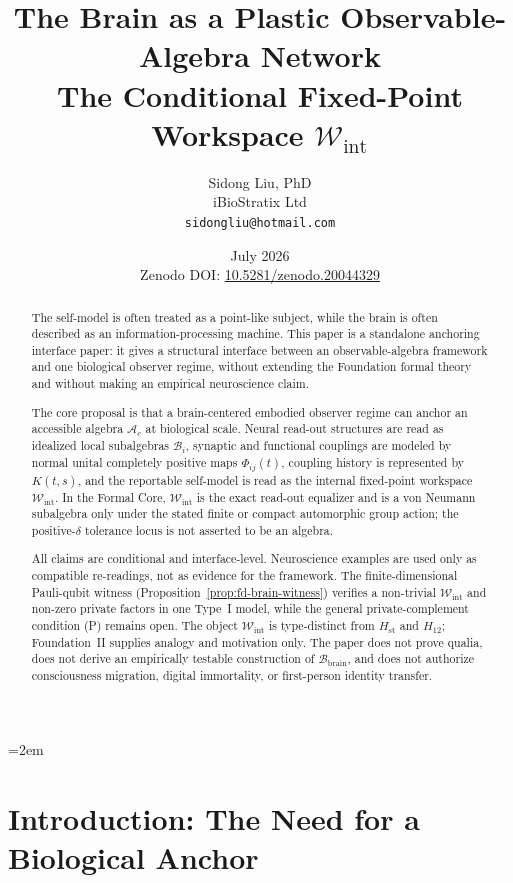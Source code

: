 \documentclass[12pt]{article}
\title{%
  \textbf{The Brain as a Plastic Observable-Algebra Network}\\
  \textbf{The Conditional Fixed-Point Workspace \(\mathcal W_{\mathrm{int}}\)}%
}
\author{
  Sidong Liu, PhD \\
  \small iBioStratix Ltd \\
  \small \texttt{sidongliu@hotmail.com}
}
\date{July 2026\\
\small Zenodo DOI: \href{https://doi.org/10.5281/zenodo.20044329}{10.5281/zenodo.20044329}}
\theoremstyle{definition}
\theoremstyle{remark}
\newcommand{\Ac}{\mathcal A_c}
\newcommand{\Bbrain}{\mathcal B_{\mathrm{brain}}}
\newcommand{\Wint}{\mathcal W_{\mathrm{int}}}
\begin{document}
\emergencystretch=2em
\raggedbottom
{}

\maketitle

\begin{abstract}
The self-model is often treated as a point-like subject, while the brain
is often described as an information-processing machine. This paper is a
standalone anchoring interface paper: it gives a structural interface
between an observable-algebra framework and one biological observer
regime, without extending the Foundation formal theory and without
making an empirical neuroscience claim.

The core proposal is that a brain-centered embodied observer regime can
anchor an accessible algebra \(\Ac\) at biological scale. Neural
read-out structures are read as idealized local subalgebras
\(\mathcal B_i\), synaptic and functional couplings are modeled by
normal unital completely positive maps \(\Phi_{ij}(t)\), coupling
history is represented by \(K(t,s)\), and the reportable self-model is
read as the internal fixed-point workspace \(\Wint\). In the Formal
Core, \(\Wint\) is the exact read-out equalizer and is a von Neumann
subalgebra only under the stated finite or compact automorphic group
action; the positive-\(\delta\) tolerance locus is not asserted to be an
algebra.

All claims are conditional and interface-level. Neuroscience examples
are used only as compatible re-readings, not as evidence for the
framework. The finite-dimensional Pauli-qubit witness
(Proposition~\ref{prop:fd-brain-witness}) verifies a non-trivial
\(\Wint\) and non-zero private factors in one Type~I model, while the
general private-complement condition (P) remains open. The object
\(\Wint\) is type-distinct from \(H_{\mathrm{st}}\) and \(H_{12}\);
Foundation~II supplies analogy and motivation only. The paper does not
prove qualia, does not derive an empirically testable construction of
\(\Bbrain\), and does not authorize consciousness migration, digital
immortality, or first-person identity transfer.
\end{abstract}

\clearpage
\tableofcontents
\clearpage

\section{Introduction: The Need for a Biological Anchor}
\end{document}
